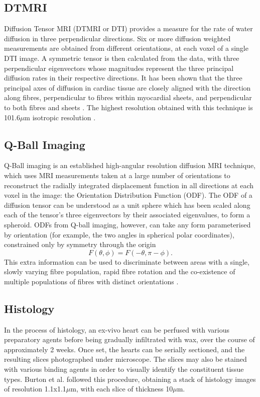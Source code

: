  \subsection{DTMRI} %
  \label{sub:dtmri}
    Diffusion Tensor MRI (DTMRI or DTI) provides a measure for the rate of water diffusion in three perpendicular directions. Six or more diffusion weighted measurements are obtained from different orientations, at each voxel of a single DTI image. A symmetric tensor is then calculated from the data, with three perpendicular eigenvectors whose magnitudes represent the three principal diffusion rates in their respective directions. It has been shown that the three principal axes of diffusion in cardiac tissue are closely aligned with the direction along fibres, perpendicular to fibres within myocardial sheets, and perpendicular to both fibres and sheets \cite{Scollan1998}. The highest resolution obtained with this technique is 101.6$\mu$m isotropic resolution \cite{Bishop2009}.
  
  
  \subsection{Q-Ball Imaging} %
  \label{sub:q_ball_imaging}
    Q-Ball imaging is an established high-angular resolution diffusion MRI technique, which uses MRI measurements taken at a large number of orientations to reconstruct the radially integrated displacement function in all directions at each voxel in the image: the Orientation Distribution Function (ODF). The ODF of a diffusion tensor can be understood as a unit sphere which has been scaled along each of the tensor's three eigenvectors by their associated eigenvalues, to form a spheroid. ODFs from Q-ball imaging, however, can take any form parameterised by orientation (for example, the two angles in spherical polar coordinates), constrained only by symmetry through the origin
    \begin{equation}
      F(\theta, \phi) = F(-\theta, \pi - \phi).
    \end{equation}
    This extra information can be used to discriminate between areas with a single, slowly varying fibre population, rapid fibre rotation and the co-existence of multiple populations of fibres with distinct orientations \cite{Dierckx2009}.
  
  
  \subsection{Histology} %
  \label{sub:histology}
  In the process of histology, an ex-vivo heart can be perfused with various preparatory agents before being gradually infiltrated with wax, over the course of approximately 2 weeks. Once set, the hearts can be serially sectioned, and the resulting slices photographed under microscope. The slices may also be stained with various binding agents in order to visually identify the constituent tissue types. Burton et al. \cite{Burton2006} followed this procedure, obtaining a stack of histology images of resolution 1.1x1.1$\mu$m, with each slice of thickness 10$\mu$m.
  
